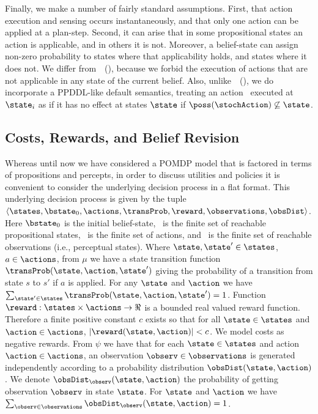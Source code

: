 Finally, we make a number of fairly standard assumptions. First, that
action execution and sensing occurs instantaneously, and that only one
action can be applied at a plan-step. Second, it can arise that in
some propositional states an action is applicable, and in others it is
not. Moreover, a belief-state can assign non-zero probability to
states where that applicability holds, and states where it does
not. We differ
from~\citeauthor{younes:littman:04}~(\citeyear{younes:littman:04}),
because we forbid the execution of actions that are not applicable in
any state of the current belief.  Also,
unlike~\citeauthor{hoffmann:brafman:2006}~(\citeyear{hoffmann:brafman:2006}),
we do incorporate a PPDDL-like default semantics, treating an action
\stochAction\ executed at $\state_i$ as if it has no effect at
states $\state$ if $\poss(\stochAction) \not\subseteq
\state$.


\subsection{Costs, Rewards, and Belief Revision}

Whereas until now we have considered a POMDP model that is factored in
terms of propositions and percepts, in order to discuss utilities and
policies it is convenient to consider the underlying decision process
in a flat format. This underlying decision process is given by the
tuple $\langle \states, \bstate_0, \actions, \transProb, \reward,
\observations, \obsDist \rangle$. Here $\bstate_0$ is the initial
belief-state, \states\ is the finite set of reachable propositional
states, \actions\ is the finite set of actions, and \observations\ is
the finite set of reachable observations (i.e., perceptual states).
Where $\state, \state' \in \states$, $a \in \actions$, from $\mu$ we
have a state transition function $\transProb(\state, \action,
\state')$ giving the probability of a transition from state $s$ to
$s'$ if $a$ is applied. For any $\state$ and $\action$ we have
$\sum_{\state' \in \states} \transProb(\state, \action, \state') = 1$.
Function $\reward:\states \times \actions \to \Re$ is a bounded real
valued reward function. Therefore a finite positive constant $c$
exists so that for all $\state \in \states$ and $\action \in
\actions$, $|\reward(\state, \action)| < c$. We model costs as
negative rewards.
From $\psi$ we have that for each $\state \in \states$ and action
$\action \in \actions$, an observation $\observ \in \observations$ is
generated independently according to a probability distribution
$\obsDist(\state, \action)$. We denote $\obsDist_\observ(\state,
\action)$ the probability of getting observation $\observ$ in state
$\state$. For $\state$ and $\action$ we have $\sum_{\observ \in
\observations} \obsDist_\observ(\state, \action) = 1$.

